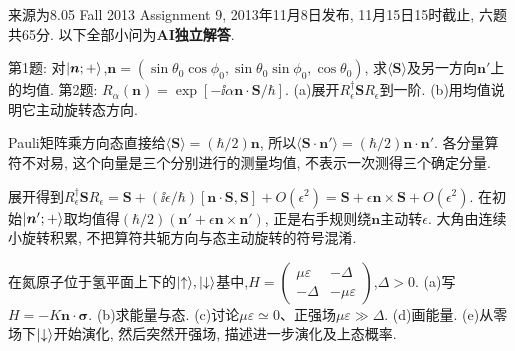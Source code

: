 来源为8.05 Fall 2013 Assignment 9, 2013年11月8日发布, 11月15日15时截止, 六题共65分. 以下全部小问为\textbf{AI独立解答}.
\begin{exercise}
第1题: 对$\lvert \boldsymbol n;+\rangle$,$\boldsymbol n=(\sin\theta_0\cos\phi_0,\sin\theta_0\sin\phi_0,\cos\theta_0)$, 求$\langle\boldsymbol S\rangle$及另一方向$\boldsymbol n'$上的均值. 第2题: $R_\alpha(\boldsymbol n)=\exp[-\ii\alpha\boldsymbol n\cdot\boldsymbol S/\hbar]$. (a)展开$R_\epsilon^\dagger\boldsymbol SR_\epsilon$到一阶. (b)用均值说明它主动旋转态方向.
\end{exercise}
\begin{solution}
Pauli矩阵乘方向态直接给$\langle\boldsymbol S\rangle=(\hbar/2)\boldsymbol n$, 所以$\langle\boldsymbol S\cdot\boldsymbol n'\rangle=(\hbar/2)\boldsymbol n\cdot\boldsymbol n'$. 各分量算符不对易, 这个向量是三个分别进行的测量均值, 不表示一次测得三个确定分量.

展开得到$R_\epsilon^\dagger\boldsymbol SR_\epsilon=\boldsymbol S+(\ii\epsilon/\hbar)[\boldsymbol n\cdot\boldsymbol S,\boldsymbol S]+O(\epsilon^2)=\boldsymbol S+\epsilon\boldsymbol n\times\boldsymbol S+O(\epsilon^2)$. 在初始$\lvert \boldsymbol n';+\rangle$取均值得$(\hbar/2)(\boldsymbol n'+\epsilon\boldsymbol n\times\boldsymbol n')$, 正是右手规则绕$\boldsymbol n$主动转$\epsilon$. 大角由连续小旋转积累, 不把算符共轭方向与态主动旋转的符号混淆.
\end{solution}
\begin{exercise}
在氮原子位于氢平面上下的$\lvert \uparrow\rangle,\lvert \downarrow\rangle$基中,$H=\left(\begin{smallmatrix}\mu\varepsilon&-\Delta\\-\Delta&-\mu\varepsilon\end{smallmatrix}\right)$,$\Delta>0$. (a)写$H=-K\boldsymbol n\cdot\boldsymbol\sigma$. (b)求能量与态. (c)讨论$\mu\varepsilon\simeq0$、正强场$\mu\varepsilon\gg\Delta$. (d)画能量. (e)从零场下$\lvert \downarrow\rangle$开始演化, 然后突然开强场, 描述进一步演化及上态概率.
\end{exercise}
